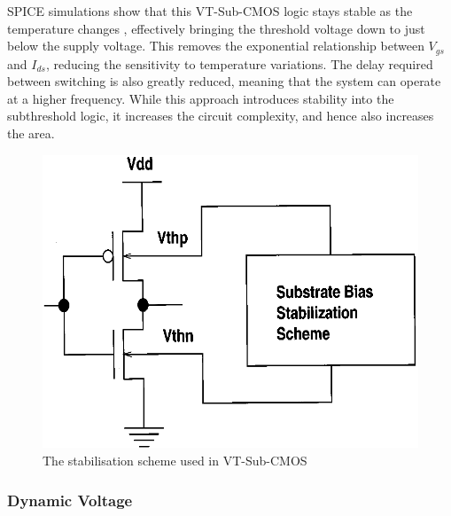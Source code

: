 SPICE simulations show that this VT-Sub-CMOS logic stays stable as the temperature changes \cite{IEEEVLSIRobustSTL}, effectively bringing the threshold voltage down to just below the supply voltage.
This removes the exponential relationship between $V_{gs}$ and $I_{ds}$, reducing the sensitivity to temperature variations.
The delay required between switching is also greatly reduced, meaning that the system can operate at a higher frequency.
While this approach introduces stability into the subthreshold logic, it increases the circuit complexity, and hence also increases the area.

\begin{figure}
	\centering
	\includegraphics[width=\columnwidth]{../../images/vtsubcmos.png}
	\caption{The stabilisation scheme used in VT-Sub-CMOS \cite{IEEEVLSIRobustSTL}}
	\label{fig:vtsubcmos}
\end{figure}

\subsubsection{Dynamic Voltage}

